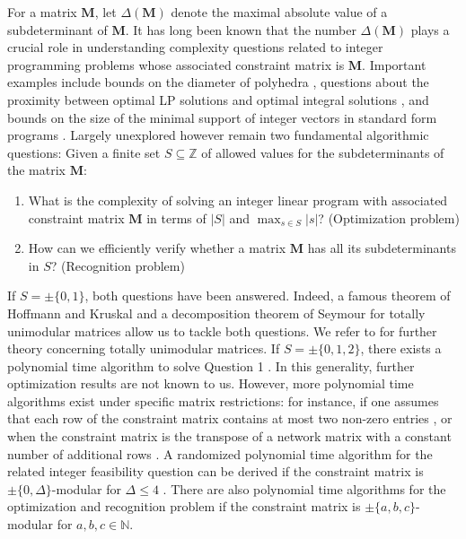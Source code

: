 \documentclass[a4paper, 11pt]{article}
\newcommand{\Z}{\mathbb{Z}}
\newcommand{\N}{\mathbb{N}}
\newcommand{\bM}{\bm{M}}
\begin{document}
	For a matrix $\bM$, let $\Delta(\bM)$ denote the maximal absolute value of a subdeterminant of $\bM$. It has long been known that the number $\Delta(\bM)$ plays a crucial role in understanding complexity questions related to integer programming problems whose associated constraint matrix is $\bM$. Important examples include bounds on the diameter of polyhedra \cite{bonisummaeisenbranddiameterpoly14,dadushhahnle2016shadowsimplex,narayananshahsri2021spectraldiameter}, questions about the proximity between optimal LP solutions and optimal integral solutions \cite{alievhenkoertel2020knapsackprox,celayakuhlpaatweis2023proxandflatness,CGST1986,lee2020improving}, and bounds on the size of the minimal support of integer vectors in standard form programs \cite{alievAverkovLoeraOertel21,alievdeloera2018supportintegeroptimal,alievdeloesparelindio2017,gribanov2024delta,svp_delta}. 
	Largely unexplored however remain two fundamental algorithmic questions: Given a finite set $S\subseteq \Z$ of allowed values for the subdeterminants of the matrix $\bM$:
	\begin{enumerate} 
		\item What is the complexity of solving an integer linear program with associated constraint matrix $\bM$ in terms of $\left| S\right|$ and $\max_{s\in S} |s|$? (Optimization problem)
		\item How can we efficiently verify whether a matrix $\bM$ has all its subdeterminants in  $S$? (Recognition problem)
	\end{enumerate}
	If $S = \pm\lbrace 0,1\rbrace$, both questions have been answered. Indeed, a famous theorem of Hoffmann and Kruskal \cite{hoffkruskal1956tustatement} and a decomposition theorem of Seymour for totally unimodular matrices \cite{SEYMOUR1980305} allow us to tackle both questions. We refer to \cite{schrijvertheorylinint86} for further theory concerning totally unimodular matrices. If $S=\pm\lbrace 0,1,2\rbrace$, there exists a polynomial time algorithm to solve Question 1 \cite{artweiszenbimodalgo2017,veselovchirkovbimodular09}. In this generality, further optimization results are not known to us. However, more polynomial time algorithms exist under specific matrix restrictions: for instance, if one assumes that each row of the constraint matrix contains at most two non-zero entries \cite{two_nonzeros_per_row,two_non_zeros_most_rows}, or when the constraint matrix is the transpose of a network matrix with a constant number of additional rows \cite{nearly_tu}. A randomized polynomial time algorithm for the related integer feasibility question can be derived if the constraint matrix is $\pm\lbrace 0,\Delta\rbrace$-modular for $\Delta\leq 4$ \cite{naegele2024advancesstrictlydelta,naegelesanzencongruence2023}. There are also polynomial time algorithms for the optimization and recognition problem if the constraint matrix is $\pm\lbrace a,b,c\rbrace$-modular \cite{glanzer2022notes} for $a,b,c \in \N$.  
	
\end{document}
